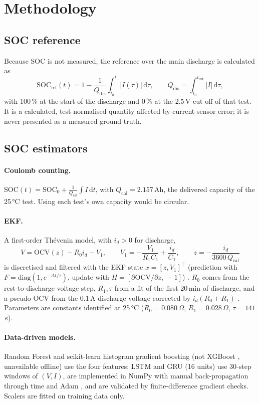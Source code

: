 \section{Methodology}
\subsection{SOC reference}
Because SOC is not measured, the reference over the main discharge is calculated as
\begin{equation}
\mathrm{SOC}_{\mathrm{ref}}(t)=1-\frac{1}{Q_{\mathrm{dis}}}\int_{t_0}^{t}|I(\tau)|\,\mathrm{d}\tau,\qquad Q_{\mathrm{dis}}=\int_{t_0}^{t_{\mathrm{cut}}}|I|\,\mathrm{d}\tau ,
\end{equation}
with 100\,\% at the start of the discharge and 0\,\% at the 2.5\,V cut-off of that test. It is a calculated, test-normalised quantity affected by current-sensor error; it is never presented as a measured ground truth.

\subsection{SOC estimators}
\paragraph{Coulomb counting.} $\mathrm{SOC}(t)=\mathrm{SOC}_0+\frac{1}{Q_{\mathrm{cal}}}\int I\,\mathrm{d}t$, with $Q_{\mathrm{cal}}=2.157$\,Ah, the delivered capacity of the 25\,°C test. Using each test's own capacity would be circular.
\paragraph{EKF.} A first-order Th\'evenin model, with $i_d>0$ for discharge,
\begin{equation}
V=\mathrm{OCV}(z)-R_0 i_d - V_1,\qquad \dot V_1=-\frac{V_1}{R_1C_1}+\frac{i_d}{C_1},\qquad \dot z=-\frac{i_d}{3600\,Q_{\mathrm{cal}}}
\end{equation}
is discretised and filtered with the EKF state $x=[z,V_1]^\top$ (prediction with $F=\mathrm{diag}(1,e^{-\Delta t/\tau})$, update with $H=[\partial\mathrm{OCV}/\partial z,\,-1]$) \cite{plett2004ekf3}. $R_0$ comes from the rest-to-discharge voltage step, $R_1,\tau$ from a fit of the first 20\,min of discharge, and a pseudo-OCV from the 0.1\,A discharge voltage corrected by $i_d(R_0+R_1)$ \cite{weng2014}. Parameters are constants identified at 25\,°C ($R_0=0.080\,\Omega$, $R_1=0.028\,\Omega$, $\tau=141$\,s).
\paragraph{Data-driven models.} Random Forest \cite{breiman2001} and scikit-learn histogram gradient boosting (not XGBoost \cite{chen2016xgb}, unavailable offline) use the four features; LSTM \cite{hochreiter1997} and GRU \cite{cho2014} (16 units) use 30-step windows of $(V,I)$, are implemented in NumPy with manual back-propagation through time and Adam \cite{kingma2015}, and are validated by finite-difference gradient checks. Scalers are fitted on training data only.

